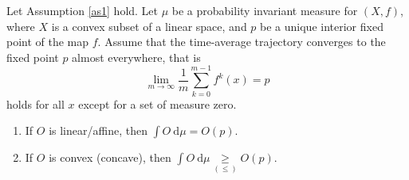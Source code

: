\documentclass[format=acmsmall, authorversion, screen=true]{acmart}
\def\R{\ensuremath{\mathbb{R}}}
\def\dmu{\mathrm{d}\mu}
\begin{document}
\begin{theorem}\label{thm2}
Let Assumption \ref{as1} hold. Let $\mu$ be a probability invariant measure for $(X,f)$, where $X$ is a convex subset of a linear space, and $p$ be a unique interior fixed point of the map $f$. Assume that the time-average trajectory converges to the fixed point $p$ almost everywhere, that is 
\begin{equation}\label{thm2:eq-1}
 \lim\limits_{m \to \infty} \frac{1}{m} \sum_{k=0}^{m-1} f^k(x) = p
\end{equation}
holds for all $x$ except for a set of measure zero.
\begin{enumerate}
\item If $O$ is linear/affine, then
$ \int O\: \dmu = O(p)$.

\item If $O$ is convex (concave), then
$\int O\: \dmu \underset{(\leqslant)}{\geqslant} O(p)$.
\end{enumerate}

\end{theorem}
\end{document}
